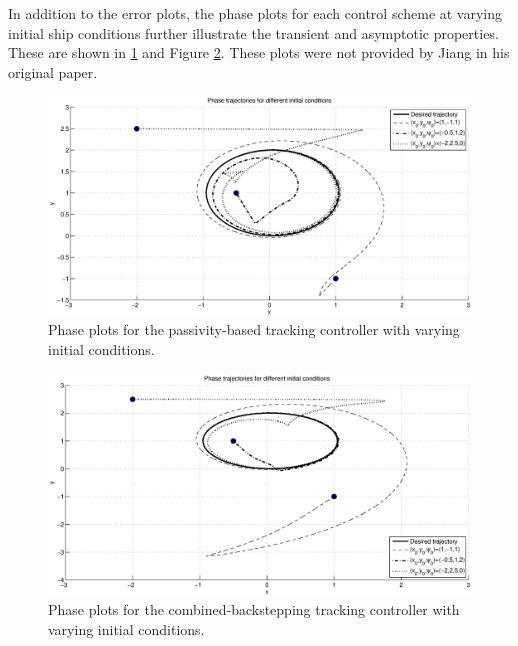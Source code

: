 \documentclass[amsthm, twocolumn]{autart}
\begin{document}
{In addition to the error plots, the phase plots for each control scheme at varying initial ship conditions further illustrate the transient and asymptotic properties. These are shown in \ref{fig:pass_traj} and Figure \ref{fig:back_traj}. These plots were not provided by Jiang in his original paper.
%
\begin{figure}[!h!t]
\begin{center}
\centering 
\includegraphics[scale=0.41, trim = 30mm 5mm 30mm 5mm, clip]{FIG_passivity_trajectories.eps}
\caption{Phase plots for the passivity-based tracking controller with varying initial conditions.}
\label{fig:pass_traj}
\end{center}
\end{figure}
\begin{figure}[!h!t]
\begin{center}
\centering 
\includegraphics[scale=0.41, trim = 30mm 5mm 30mm 5mm, clip]{FIG_backstepping_trajectories.eps}
\caption{Phase plots for the combined-backstepping tracking controller with varying initial conditions.}
\label{fig:back_traj}
\end{center}
\end{figure}
%
%
%
}
\end{document}

